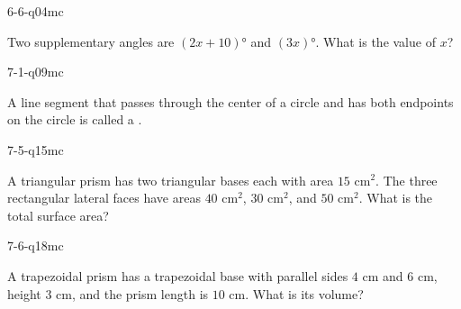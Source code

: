 \begin{practiceQuestion}{6-6-q04}{mc}
\begin{questionText}
Two supplementary angles are $(2x + 10)°$ and $(3x)°$. What is the value of $x$?
\end{questionText}
\end{practiceQuestion}

\begin{practiceQuestion}{7-1-q09}{mc}
\begin{questionText}
A line segment that passes through the center of a circle and has both endpoints on the circle is called a \underline{\hspace{1.5cm}}.
\end{questionText}
\end{practiceQuestion}

\begin{practiceQuestion}{7-5-q15}{mc}
\begin{questionText}
A triangular prism has two triangular bases each with area $15$ cm$^2$. The three rectangular lateral faces have areas $40$ cm$^2$, $30$ cm$^2$, and $50$ cm$^2$. What is the total surface area?
\end{questionText}
\end{practiceQuestion}

\begin{practiceQuestion}{7-6-q18}{mc}
\begin{questionText}
A trapezoidal prism has a trapezoidal base with parallel sides $4$ cm and $6$ cm, height $3$ cm, and the prism length is $10$ cm. What is its volume?
\end{questionText}
\end{practiceQuestion}

